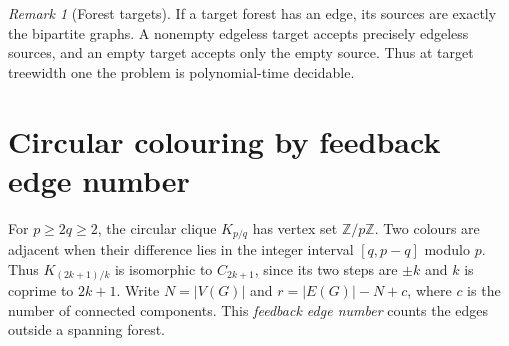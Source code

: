 \documentclass[11pt]{article}
\theoremstyle{remark}
\newtheorem{remark}[theorem]{Remark}
\newcommand{\Z}{\mathbb{Z}}
\begin{document}
\begin{remark}[Forest targets]
If a target forest has an edge, its sources are exactly the bipartite
graphs. A nonempty edgeless target accepts precisely edgeless sources,
and an empty target accepts only the empty source. Thus at target
treewidth one the problem is polynomial-time decidable.
\end{remark}

\section{Circular colouring by feedback edge number}\label{sec:edge-alg}
For $p\geq2q\geq2$, the circular clique $K_{p/q}$ has vertex set
$\Z/p\Z$. Two colours are adjacent when their difference lies in the
integer interval $[q,p-q]$ modulo $p$. Thus $K_{(2k+1)/k}$ is
isomorphic to $C_{2k+1}$, since its two steps are $\pm k$ and $k$ is
coprime to $2k+1$. Write $N=|V(G)|$ and $r=|E(G)|-N+c$, where $c$
is the number of connected components. This \emph{feedback edge number}
counts the edges outside a spanning forest.
\end{document}
